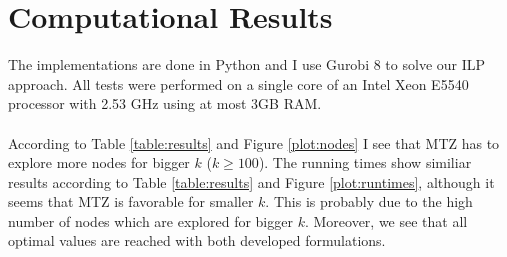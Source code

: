 \documentclass[11pt]{article}
\begin{document}
\section{Computational Results}
The implementations are done in Python and I use Gurobi 8 to solve our ILP approach.
All tests were performed on a single core of an 
Intel Xeon E5540 processor with 2.53 GHz
using at most 3GB RAM.
\\ \\
According to Table \ref{table:results} and Figure \ref{plot:nodes} I see that MTZ has to explore more nodes for bigger $k$ ($k \geq 100$). The running times show similiar results according to Table \ref{table:results} and Figure \ref{plot:runtimes}, although it seems that MTZ is favorable for smaller $k$. This is probably due to the high number of nodes which are explored for bigger $k$. Moreover, we see that all optimal values are reached with both developed formulations.
\end{document}
